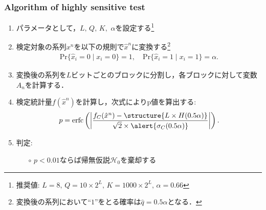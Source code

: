 \documentclass[dvipdfmx,11pt]{beamer}
\begin{document}
\begin{frame}[t]\frametitle{Algorithm of highly sensitive test}
\begin{enumerate}\setlength{\itemsep}{.5\baselineskip}
  \item パラメータとして，$L,\,Q,\,K,\,\,\alpha$を設定する\footnote{
  推奨値: $L=8,\,Q=10\times2^L,\,K=1000\times2^L,\,\alpha=0.66$
  }
  \item 検定対象の系列$x^n$を以下の規則で$\hat{x}^n$に変換する\footnote{変換後の系列において``$1$''をとる確率は$\hat{q}=0.5\alpha$となる．}
      \begin{align*}
        \mathrm{Pr}\{ \hat{x}_i = 0 \mid x_i = 0 \} = 1, \quad
        \mathrm{Pr}\{ \hat{x}_i = 1 \mid x_i = 1 \} = \alpha.
      \end{align*}
  \item 変換後の系列を$L$ビットごとのブロックに分割し，各ブロックに対して変数$A_n$を計算する．
  \item 検定統計量$f(\hat{x}^n)$を計算し，次式によりp値を算出する:
  \begin{align*}
    p = \mathrm{erfc} \left( \left| \frac{f_C(\hat{x}^n) - \structure{L \times H(0.5\alpha)}}{\sqrt{2} \times  \alert{\sigma_C(0.5\alpha)}} \right| \right).
  \end{align*}
  \item 判定:
    \begin{itemize}\setlength{\itemsep}{.2\baselineskip}
      \item[$\circ$] $p < 0.01$ならば帰無仮説$\mathcal{H}_0$を棄却する
    \end{itemize}
\end{enumerate}
\end{frame}
\end{document}
